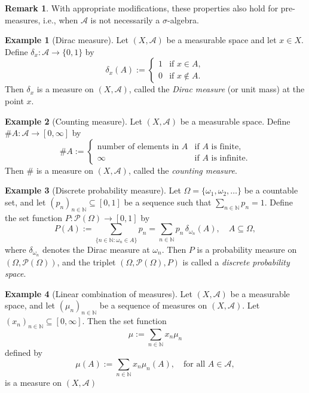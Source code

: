 \documentclass{article}
\theoremstyle{definition}
\newtheorem{example}{Example}[section]
\newtheorem{remark}{Remark}[section]
\begin{document}
\begin{remark}
With appropriate modifications, these properties also hold for pre-measures, i.e., when \(\mathcal{A}\) is not necessarily a \(\sigma\)-algebra.
\end{remark}


\medskip
\begin{example}[Dirac measure]
Let \((X, \mathcal{A})\) be a measurable space and let \(x \in X\). Define \(\delta_x : \mathcal{A} \to \{0,1\}\) by
\[
\delta_x(A) := 
\begin{cases}
1 & \text{if } x \in A, \\
0 & \text{if } x \notin A.
\end{cases}
\]
Then \(\delta_x\) is a measure on \((X, \mathcal{A})\), called the \emph{Dirac measure} (or unit mass) at the point \(x\).
\end{example}

\medskip
\begin{example}[Counting measure]
Let \((X, \mathcal{A})\) be a measurable space. Define \(\#A : \mathcal{A} \to [0, \infty]\) by
\[
\#A :=
\begin{cases}
\text{number of elements in } A & \text{if } A \text{ is finite}, \\
\infty & \text{if } A \text{ is infinite}.
\end{cases}
\]
Then \(\#\) is a measure on \((X, \mathcal{A})\), called the \emph{counting measure}.
\end{example}


\medskip
\begin{example}[Discrete probability measure]
Let \(\Omega = \{ \omega_1, \omega_2, \dots \}\) be a countable set, and let \((p_n)_{n \in \mathbb{N}} \subseteq [0,1]\) be a sequence such that \(\sum_{n \in \mathbb{N}} p_n = 1\). Define the set function \(P : \mathcal{P}(\Omega) \to [0,1]\) by
\[
P(A) := \sum_{\{n \in \mathbb{N} : \omega_n \in A\}} p_n = \sum_{n \in \mathbb{N}} p_n \, \delta_{\omega_n}(A), \quad A \subseteq \Omega,
\]
where \(\delta_{\omega_n}\) denotes the Dirac measure at \(\omega_n\). Then \(P\) is a probability measure on \((\Omega, \mathcal{P}(\Omega))\), and the triplet \((\Omega, \mathcal{P}(\Omega), P)\) is called a \emph{discrete probability space}.
\end{example}


\medskip
\begin{example}[Linear combination of measures]
Let \((X, \mathcal{A})\) be a measurable space, and let \((\mu_n)_{n \in \mathbb{N}}\) be a sequence of measures on \((X, \mathcal{A})\). Let \((x_n)_{n \in \mathbb{N}} \subseteq [0, \infty]\). Then the set function
\[
\mu := \sum_{n \in \mathbb{N}} x_n \mu_n
\]
defined by
\[
\mu(A) := \sum_{n \in \mathbb{N}} x_n \mu_n(A), \quad \text{for all } A \in \mathcal{A},
\]
is a measure on \((X, \mathcal{A})\)
\end{example}
\end{document}
